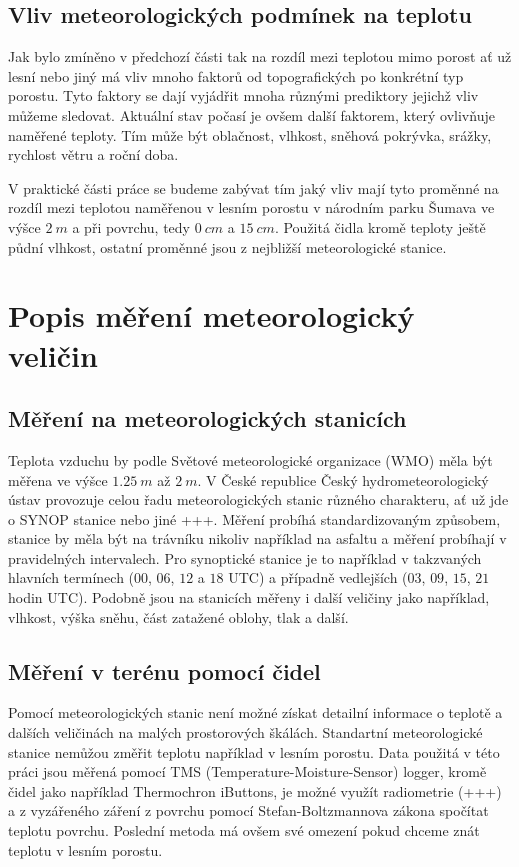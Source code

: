\subsection{Vliv meteorologických podmínek na teplotu}
Jak bylo zmíněno v předchozí části tak na rozdíl mezi teplotou mimo porost ať už lesní nebo jiný má vliv mnoho faktorů od topografických po konkrétní typ porostu. Tyto faktory se dají vyjádřit mnoha různými prediktory jejichž vliv můžeme sledovat. Aktuální stav počasí je ovšem další faktorem, který ovlivňuje naměřené teploty. Tím může být oblačnost, vlhkost, sněhová pokrývka, srážky, rychlost větru a roční doba.

V praktické části práce se budeme zabývat tím jaký vliv mají tyto proměnné na rozdíl mezi teplotou naměřenou v lesním porostu v národním parku Šumava ve výšce $\SI{2}{m}$ a při povrchu, tedy $\SI{0}{cm}$ a $\SI{15}{cm}$. Použitá čidla kromě teploty ještě půdní vlhkost, ostatní proměnné jsou z nejbližší meteorologické stanice.

\section{Popis měření meteorologický veličin} \label{chap:measure}
\subsection{Měření na meteorologických stanicích}
Teplota vzduchu by podle Světové meteorologické organizace (WMO) měla být měřena ve výšce $\SI{1.25}{m}$ až $\SI{2}{m}$\cite{wmoGuidance2021}. V České republice Český hydrometeorologický ústav provozuje celou řadu meteorologických stanic různého charakteru, ať už jde o SYNOP stanice nebo jiné +++. Měření probíhá standardizovaným způsobem, stanice by měla být na trávníku nikoliv například na asfaltu a měření probíhají v pravidelných intervalech. Pro synoptické stanice je to například v takzvaných hlavních termínech ($00$, $06$, $12$ a $18$ UTC) a případně vedlejších ($03$, $09$, $15$, $21$ hodin UTC). Podobně jsou na stanicích měřeny i další veličiny jako například, vlhkost, výška sněhu, část zatažené oblohy, tlak a další. 

\subsection{Měření v terénu pomocí čidel}
Pomocí meteorologických stanic není možné získat detailní informace o teplotě a dalších veličinách na malých prostorových škálách. Standartní meteorologické stanice nemůžou změřit teplotu například v lesním porostu. Data použitá v této práci jsou měřená pomocí TMS (Temperature-Moisture-Sensor) logger, kromě čidel jako například Thermochron iButtons, je možné využít radiometrie (+++) a z vyzářeného záření z povrchu pomocí Stefan-Boltzmannova zákona spočítat teplotu povrchu. Poslední metoda má ovšem své omezení pokud chceme znát teplotu v lesním porostu. 

